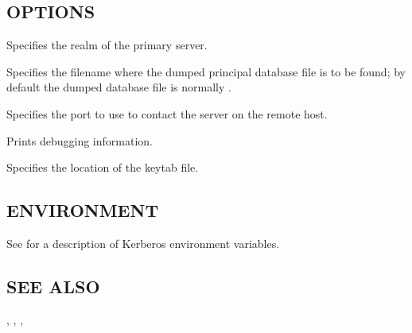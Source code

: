 \documentclass[letterpaper,10pt,english]{sphinxmanual}
\begin{document}
\subsection{OPTIONS}
\label{\detokenize{admin/admin_commands/kprop:options}}\begin{description}
\sphinxAtStartPar
Specifies the realm of the primary server.

\sphinxAtStartPar
Specifies the filename where the dumped principal database file is
to be found; by default the dumped database file is normally
{\hyperref[\detokenize{mitK5defaults:paths}]{}}.

\sphinxAtStartPar
Specifies the port to use to contact the {\hyperref[\detokenize{admin/admin_commands/kpropd:kpropd-8}]{}} server
on the remote host.

\sphinxAtStartPar
Prints debugging information.

\sphinxAtStartPar
Specifies the location of the keytab file.

\end{description}


\subsection{ENVIRONMENT}
\label{\detokenize{admin/admin_commands/kprop:environment}}
\sphinxAtStartPar
See  for a description of Kerberos environment
variables.


\subsection{SEE ALSO}
\label{\detokenize{admin/admin_commands/kprop:see-also}}
\sphinxAtStartPar
{\hyperref[\detokenize{admin/admin_commands/kpropd:kpropd-8}]{}}, {\hyperref[\detokenize{admin/admin_commands/kdb5_util:kdb5-util-8}]{}}, {\hyperref[\detokenize{admin/admin_commands/krb5kdc:krb5kdc-8}]{}},
\end{document}
